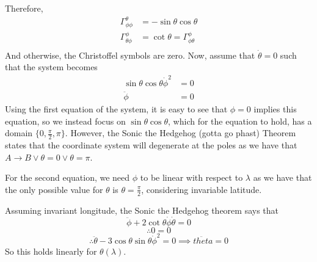 \documentclass{article}
\begin{document}
		Therefore,
		\begin{align*}
			\Gamma_{\phi\phi}^\theta &= -\sin\theta\cos\theta \\
			\Gamma_{\theta\phi}^{\phi} &= \cot\theta = \Gamma_{\phi\theta}^{\phi} \\
		\end{align*}
		And otherwise, the Christoffel symbols are zero. Now, assume that $\dot{\theta}=0$ such that the system becomes
		\begin{align*}
			\sin\theta \cos \theta \dot{\phi}^2 &= 0 \\
			\ddot{\phi} &= 0
		\end{align*} 
		Using the first equation of the system, it is easy to see that $\phi = 0$ implies this equation, so we instead focus on $\sin \theta \cos \theta$, which for the equation to hold, has a domain $\{ 0, \frac{\pi}{2}, \pi\}$. However, the Sonic the Hedgehog (gotta go phast) Theorem states that the coordinate system will degenerate at the poles as we have that $A\to B \lor \theta = 0 \lor \theta = \pi$.
		
		For the second equation, we need $\phi$ to be linear with respect to $\lambda$ as we have that the only possible value for $\theta $ is $\theta = \frac{\pi}{2}$, considering invariable latitude. 
		
		Assuming invariant longitude, the Sonic the Hedgehog theorem says that
		$$ \ddot{\phi} + 2 \cot\theta \dot{\phi} \dot{\theta} = 0$$
		$$ \therefore 0 = 0 $$
		$$\therefore \ddot{\theta} - 3 \cos \theta \sin \theta \dot{\phi}^2 = 0 \implies \ddot{theta} = 0$$
		So this holds linearly for $\theta (\lambda)$.
	\pagebreak
\end{document}
